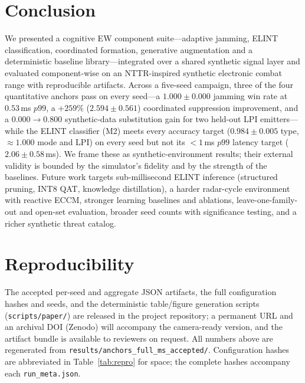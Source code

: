 \documentclass[journal]{IEEEtran}
\begin{document}
\section{Conclusion}
We presented a cognitive EW component suite---adaptive jamming, ELINT classification,
coordinated formation, generative augmentation and a deterministic baseline library---integrated over a
shared synthetic signal layer and evaluated component-wise on an NTTR-inspired synthetic
electronic combat range with reproducible artifacts. Across a five-seed
campaign, three of the four quantitative anchors pass on every seed---a $1.000 \pm 0.000$ jamming
win rate at $0.53$\,ms $p99$, a $+259\%$ ($2.594 \pm 0.561$) coordinated suppression improvement,
and a $0.000\!\to\!0.800$ synthetic-data substitution gain for two held-out LPI emitters---while
the ELINT classifier (M2) meets every accuracy target ($0.984 \pm 0.005$ type, $\approx 1.000$
mode and LPI) on every seed but not its $<1$\,ms $p99$ latency target ($2.06 \pm 0.58$\,ms). We
frame these as synthetic-environment results; their external validity is bounded by the
simulator's fidelity and by the strength of the baselines. Future work targets sub-millisecond
ELINT inference (structured pruning, INT8 QAT, knowledge distillation), a harder radar-cycle
environment with reactive ECCM, stronger learning baselines and ablations, leave-one-family-out
and open-set evaluation, broader seed counts with significance testing, and a richer synthetic
threat catalog.

\section*{Reproducibility}
The accepted per-seed and aggregate JSON artifacts, the full configuration hashes and seeds, and
the deterministic table/figure generation scripts (\texttt{scripts/paper/}) are released in the
project repository; a permanent URL and an archival DOI (Zenodo) will accompany the camera-ready
version, and the artifact bundle is available to reviewers on request. All numbers above are
regenerated from \texttt{results/anchors\_full\_ms\_accepted/}. Configuration hashes are
abbreviated in Table~\ref{tab:repro} for space; the complete hashes accompany each
\texttt{run\_meta.json}.



\end{document}
